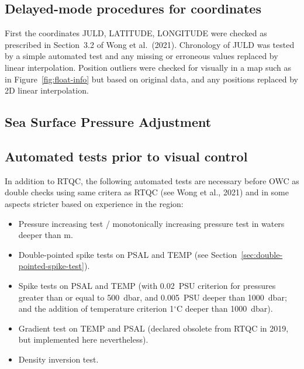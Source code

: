 \documentclass{article}
\begin{document}
\subsection{Delayed-mode procedures for coordinates}\label{sec:DM-coordinates}
First the coordinates JULD, LATITUDE, LONGITUDE were checked as prescribed
in Section~3.2 of Wong et al.~(2021).
%
Chronology of JULD was tested by a simple automated test and any missing
or erroneous values replaced by linear interpolation.
%
Position outliers were checked for visually in a map such as in
Figure~\ref{fig:float-info} but based on original data, and any positions
replaced by 2D linear interpolation.


\newpage
\subsection{Sea Surface Pressure Adjustment}


\newpage
\subsection{Automated tests prior to visual control}\label{sec:automatedDMQC}
In addition to RTQC, the following automated tests are necessary before 
OWC as double checks using same critera as RTQC (see Wong et al., 2021)
and in some aspects stricter based on experience in the region:
\begin{itemize}
\item Pressure increasing test / monotonically increasing pressure test in
  waters deeper than m.
\item Double-pointed spike tests on PSAL and TEMP (see Section~\ref{sec:double-pointed-spike-test}).
\item Spike tests on PSAL and TEMP (with 0.02~PSU criterion for pressures
  greater than or equal to 500~dbar, and 0.005~PSU deeper than 1000~dbar;
  and the addition of temperature criterion 1$^\circ$C deeper than 1000~dbar).
\item Gradient test on TEMP and PSAL (declared obsolete from RTQC in 2019,
  but implemented here nevertheless).
\item Density inversion test.
\end{itemize}
\end{document}
